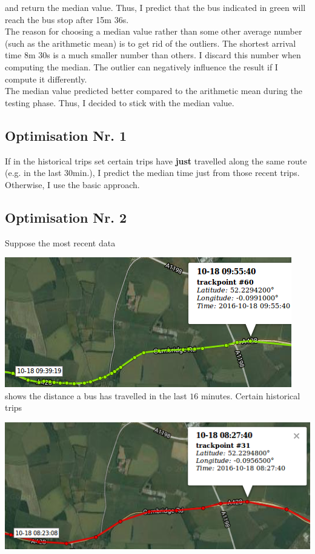 \documentclass[12pt,a4paper,oneside,openright]{report}
\begin{document}
\:
\:

and return the median value. Thus, I predict that the bus indicated in green will
reach the bus stop after 15m 36s. \\

The reason for choosing a median value rather than some other average number
(such as the arithmetic mean) is to get rid of the outliers. The shortest arrival time
8m 30s is a much smaller number than others. I discard this number when computing
the median. The outlier can negatively influence the result if I compute it differently. \\

The median value predicted better compared to the arithmetic mean during the testing
phase. Thus, I decided to stick with the median value.

\subsection{Optimisation Nr. 1}

If in the historical trips set certain trips have \textbf{just} travelled along
the same route (e.g. in the last $30$min.), I predict the median time just from
those recent trips. Otherwise, I use the basic approach.

\subsection{Optimisation Nr. 2}

Suppose the most recent data

\includegraphics[scale = 0.7]{figs/recent_trip.png} \\

shows the distance a bus has travelled in the last $16$ minutes. Certain historical
trips

\includegraphics[scale = 0.7]{figs/inaccurate_historical.png} \\
\end{document}
